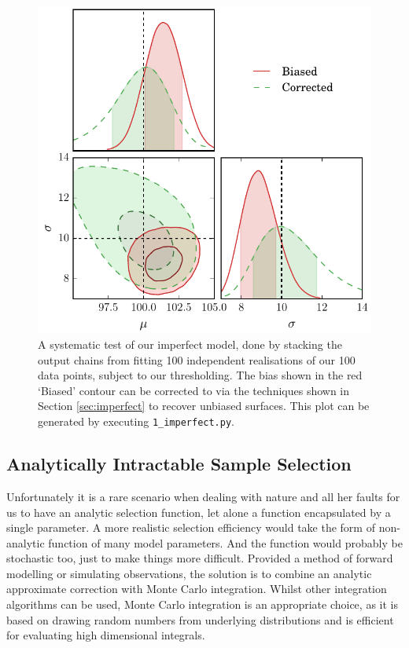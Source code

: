\documentclass[a4paper,fleqn,usenatbib]{mnras}
\newcommand{\green}{\color{ForestGreen}}
\begin{document}
\begin{figure}
	\begin{center}
		\includegraphics[width=\columnwidth]{fig_1_imperfect.pdf}
	\end{center}
	\caption{A systematic test of our imperfect model, done by stacking the output chains from fitting 100 independent realisations of our 100 data points, subject to our thresholding. The bias shown in the red `Biased' contour can be corrected to via the techniques shown in Section \ref{sec:imperfect} to recover unbiased surfaces. {\green This plot can be generated by executing  \mbox{\texttt{1\_imperfect.py}}.}}
	\label{fig:imperfect}
\end{figure}












\subsection{Analytically Intractable Sample Selection}
\label{sec:real}
Unfortunately it is a rare scenario when dealing with nature and all her faults for us to have an analytic selection function, let alone a function encapsulated by a single parameter. A more realistic selection efficiency would take the form of non-analytic function of many model parameters. And the function would probably be stochastic too, just to make things more difficult. Provided a method of forward modelling or simulating observations, the solution is to combine an analytic approximate correction with Monte Carlo integration. Whilst other integration algorithms can be used, Monte Carlo integration is an appropriate choice, as it is based on drawing random numbers from underlying distributions and is efficient for evaluating high dimensional integrals.
\end{document}
